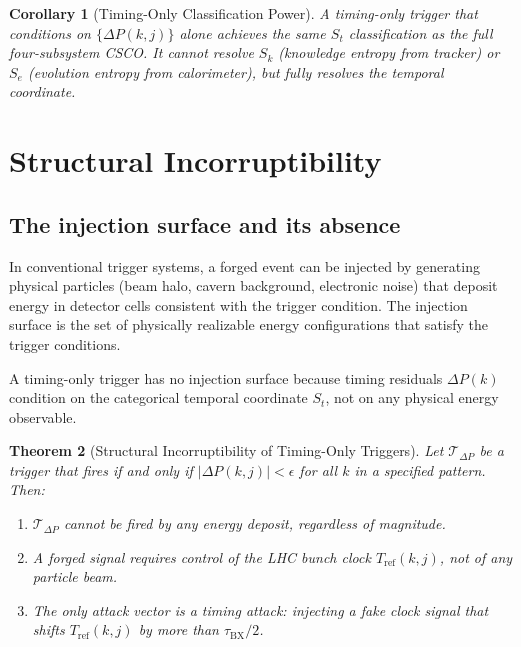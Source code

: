 \documentclass[twocolumn,10pt,a4paper]{article}
\theoremstyle{thmstyle}
\newtheorem{theorem}{Theorem}[section]
\newtheorem{corollary}[theorem]{Corollary}
\theoremstyle{definition}
\theoremstyle{remark}
\newcommand{\tBX}{\tau_{\mathrm{BX}}}
\newcommand{\DeltaP}{\Delta P}
\begin{document}
\begin{corollary}[Timing-Only Classification Power]
A timing-only trigger that conditions on $\{\DeltaP(k,j)\}$ alone
achieves the same $S_t$ classification as the full four-subsystem CSCO.
It cannot resolve $S_k$ (knowledge entropy from tracker) or $S_e$
(evolution entropy from calorimeter), but fully resolves the temporal
coordinate.
\end{corollary}

\section{Structural Incorruptibility}
\label{sec:incorruptibility}

\subsection{The injection surface and its absence}

In conventional trigger systems, a forged event can be injected by
generating physical particles (beam halo, cavern background, electronic
noise) that deposit energy in detector cells consistent with the trigger
condition. The injection surface is the set of physically realizable
energy configurations that satisfy the trigger conditions.

A timing-only trigger has no injection surface because timing residuals
$\DeltaP(k)$ condition on the categorical temporal coordinate $S_t$,
not on any physical energy observable.

\begin{theorem}[Structural Incorruptibility of Timing-Only Triggers]
\label{thm:incorruptibility}
Let $\mathcal{T}_{\DeltaP}$ be a trigger that fires if and only if
$|\DeltaP(k,j)| < \epsilon$ for all $k$ in a specified pattern.
Then:
\begin{enumerate}[nosep,label=(\roman*)]
\item $\mathcal{T}_{\DeltaP}$ cannot be fired by any energy deposit,
regardless of magnitude.
\item A forged signal requires control of the LHC bunch clock
$T_{\mathrm{ref}}(k,j)$, not of any particle beam.
\item The only attack vector is a timing attack: injecting a fake
clock signal that shifts $T_{\mathrm{ref}}(k,j)$ by more than $\tBX/2$.
\end{enumerate}
\end{theorem}
\end{document}
